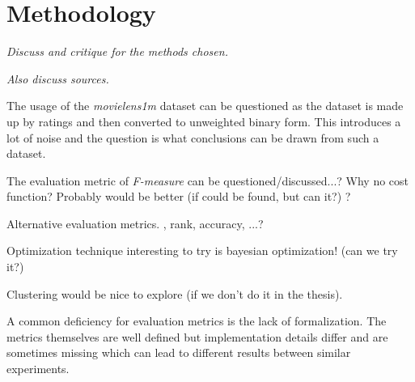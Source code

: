 

\section{Methodology}\label{sec:disc:method}

\textit{Discuss and critique for the methods chosen.}

\textit{Also discuss sources.}

The usage of the \textit{movielens1m} dataset can be questioned as the dataset is made up by ratings and then converted to unweighted binary form. This introduces a lot of noise and the question is what conclusions can be drawn from such a dataset.

The evaluation metric of \textit{F-measure} can be questioned/discussed...? Why no cost function? Probably would be better (if could be found, but can it?) ?

Alternative evaluation metrics. \rmse, rank, accuracy, ...?

Optimization technique interesting to try is bayesian optimization! (can we try it?)

Clustering would be nice to explore (if we don't do it in the thesis).

A common deficiency for evaluation metrics is the lack of formalization. The metrics themselves are well defined but implementation details differ and are sometimes missing which can lead to different results between similar experiments.
